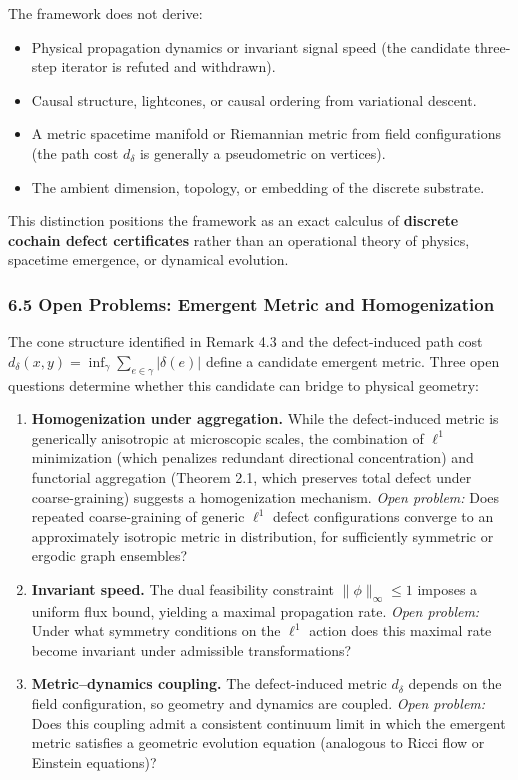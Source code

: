 \documentclass[
]{article}
\providecommand{\tightlist}{%
  \setlength{\itemsep}{0pt}\setlength{\parskip}{0pt}}
\providecommand{\tightlist}{%
  \setlength{\itemsep}{0pt}\setlength{\parskip}{0pt}}
\begin{document}
The framework does not derive:

\begin{itemize}
\tightlist
\item
  Physical propagation dynamics or invariant signal speed (the candidate three-step iterator is refuted and withdrawn).
\item
  Causal structure, lightcones, or causal ordering from variational descent.
\item
  A metric spacetime manifold or Riemannian metric from field configurations (the path cost \(d_\delta\) is generally a pseudometric on vertices).
\item
  The ambient dimension, topology, or embedding of the discrete substrate.
\end{itemize}

This distinction positions the framework as an exact calculus of \textbf{discrete cochain defect certificates} rather than an operational theory of physics, spacetime emergence, or dynamical evolution.

\subsubsection{6.5 Open Problems: Emergent Metric and Homogenization}\label{open-problems-emergent-metric-and-homogenization}

The cone structure identified in Remark 4.3 and the defect-induced path cost \(d_\delta(x,y) = \inf_\gamma \sum_{e \in \gamma} |\delta(e)|\) define a candidate emergent metric. Three open questions determine whether this candidate can bridge to physical geometry:

\begin{enumerate}
\def\labelenumi{\arabic{enumi}.}
\item
  \textbf{Homogenization under aggregation.} While the defect-induced metric is generically anisotropic at microscopic scales, the combination of \(\ell^1\) minimization (which penalizes redundant directional concentration) and functorial aggregation (Theorem 2.1, which preserves total defect under coarse-graining) suggests a homogenization mechanism. \emph{Open problem:} Does repeated coarse-graining of generic \(\ell^1\) defect configurations converge to an approximately isotropic metric in distribution, for sufficiently symmetric or ergodic graph ensembles?
\item
  \textbf{Invariant speed.} The dual feasibility constraint \(\|\phi\|_\infty \le 1\) imposes a uniform flux bound, yielding a maximal propagation rate. \emph{Open problem:} Under what symmetry conditions on the \(\ell^1\) action does this maximal rate become invariant under admissible transformations?
\item
  \textbf{Metric--dynamics coupling.} The defect-induced metric \(d_\delta\) depends on the field configuration, so geometry and dynamics are coupled. \emph{Open problem:} Does this coupling admit a consistent continuum limit in which the emergent metric satisfies a geometric evolution equation (analogous to Ricci flow or Einstein equations)?
\end{enumerate}
\end{document}
